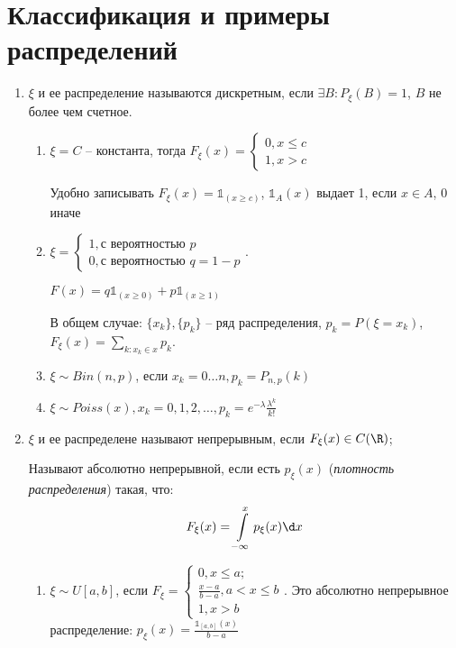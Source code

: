 \section{Классификация и примеры распределений}
\begin{enumerate}[label=\Roman*.]
    \item $\xi$ и ее распределение называются дискретным, если $\exists B\colon P_{\xi}(B) = 1$, $B$ не более чем счетное.
    \begin{enumerate}[label=\arabic*.]
    \item $\xi = C$ -- константа, тогда $F_{\xi}(x) = \begin{cases} 0, x \leq c \\ 1, x > c\end{cases}$
    \begin{Rem}
        Удобно записывать $F_{\xi}(x) = \mathbb{1}_{(x \geq c)}$, $\mathbb{1}_A (x)$ выдает 1, если $x \in A$, 0 иначе
    \end{Rem}   
    \item $\xi = \begin{cases} 1, \text{с вероятностью } p \\ 0, \text{с вероятностью } q = 1 - p\end{cases}$.

    $F(x) = q \mathbb{1}_{(x \geq 0)} + p \mathbb{1}_{(x \geq 1)}$

    В общем случае: $\{x_k\}, \{p_k\}$ -- ряд распределения, $p_k = P(\xi = x_k)$, $F_{\xi}(x) = \sum\limits_{k\colon x_k \in x} p_k$.

    \item
    $\xi \sim Bin(n, p)$, если $x_k = 0 \dots n, p_k = P_{n,p}(k)$

    \item
    $\xi \sim Poiss(x), x_k = 0, 1, 2, \dots, p_k = e^{-\lambda} \frac{\lambda^k}{k!}$
    \end{enumerate}
    \item
   	\begin{Def}
    $\xi$ и ее распределене называют непрерывным, если $F_{\xi}(x) \in C(\R)$; 
    \end{Def}
    
    \begin{Def}
    Называют абсолютно непрерывной, если есть $p_{\xi}(x)$ (\textit{плотность распределения}) такая, что:
    \[ F_{\xi}(x) =\int\limits_{-\infty}^{x} p_{\xi}(x) \d x\]
    \end{Def}

    \begin{enumerate}[label=\arabic*.]
    \item
    	$\xi \sim U[a, b]$, если
    	$F_{\xi} = \begin{cases}
    		0, x \leq a; \\
    		\frac{x - a}{b - a}, a < x \leq b \\
    		1, x > b\end{cases}$.
		Это абсолютно непрерывное распределение:
        $p_{\xi}(x) = \frac{\mathbb{1}_{[a, b]}(x)}{b - a}$


\end{enumerate}
\end{enumerate}
